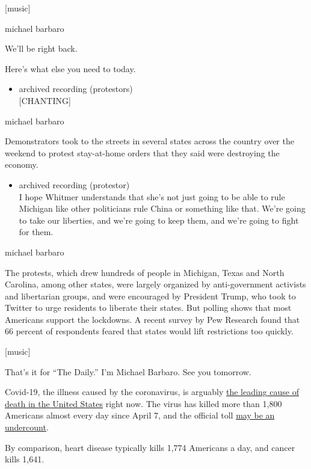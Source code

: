 {[}music{]}

michael barbaro

We'll be right back.

Here's what else you need to today.

\begin{itemize}
\tightlist
\item
  archived recording (protestors)\\
  {[}CHANTING{]}
\end{itemize}

michael barbaro

Demonstrators took to the streets in several states across the country
over the weekend to protest stay-at-home orders that they said were
destroying the economy.

\begin{itemize}
\tightlist
\item
  archived recording (protestor)\\
  I hope Whitmer understands that she's not just going to be able to
  rule Michigan like other politicians rule China or something like
  that. We're going to take our liberties, and we're going to keep them,
  and we're going to fight for them.
\end{itemize}

michael barbaro

The protests, which drew hundreds of people in Michigan, Texas and North
Carolina, among other states, were largely organized by anti-government
activists and libertarian groups, and were encouraged by President
Trump, who took to Twitter to urge residents to liberate their states.
But polling shows that most Americans support the lockdowns. A recent
survey by Pew Research found that 66 percent of respondents feared that
states would lift restrictions too quickly.

{[}music{]}

That's it for ``The Daily.'' I'm Michael Barbaro. See you tomorrow.

Covid-19, the illness caused by the coronavirus, is arguably
\href{https://public.flourish.studio/visualisation/1830480/}{the leading
cause of death in the United States} right now. The virus has killed
more than 1,800 Americans almost every day since April 7, and the
official toll
\href{https://www.nytimes.com/2020/04/10/nyregion/new-york-coronavirus-death-count.html}{may
be an undercount}.

By comparison, heart disease typically kills 1,774 Americans a day, and
cancer kills 1,641.

